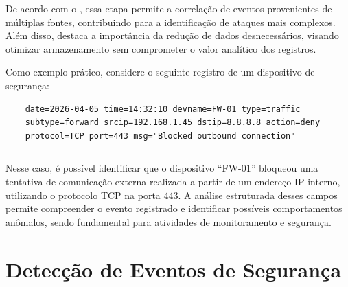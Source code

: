 \documentclass[
    12pt
    ,oneside
    ,a4paper
    ,chapter=TITLE
    ,section=TITLE
    ,sumario=abnt-6027-2012]{abntex2}
\begin{document}
De acordo com o , essa etapa permite a correlação de eventos provenientes de múltiplas fontes, contribuindo para a identificação de ataques mais complexos. Além disso,  destaca a importância da redução de dados desnecessários, visando otimizar armazenamento sem comprometer o valor analítico dos registros.

Como exemplo prático, considere o seguinte registro de um dispositivo de segurança:


\begin{codigo}[H]
\begin{lstlisting}
    date=2026-04-05 time=14:32:10 devname=FW-01 type=traffic 
    subtype=forward srcip=192.168.1.45 dstip=8.8.8.8 action=deny 
    protocol=TCP port=443 msg="Blocked outbound connection"
\end{lstlisting}
\fonteautor
\end{codigo}

\begin{verbatim}
\end{verbatim}

Nesse caso, é possível identificar que o dispositivo ``FW-01'' bloqueou uma tentativa de comunicação externa realizada a partir de um endereço IP interno, utilizando o protocolo TCP na porta 443. A análise estruturada desses campos permite compreender o evento registrado e identificar possíveis comportamentos anômalos, sendo fundamental para atividades de monitoramento e segurança.



\chapter{Detecção de Eventos de Segurança}
\label{cap:detection}
\end{document}
